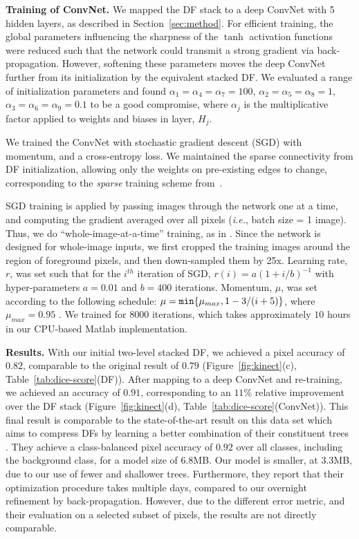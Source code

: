 \documentclass[twocolumn]{svjour3}
\begin{document}
\textbf{Training of ConvNet. } 
%
We mapped the DF stack to a deep ConvNet with 5 hidden layers, as described in Section~\ref{sec:method}. For efficient training, the global parameters influencing the sharpness of the $\tanh$ activation functions were reduced such that the network could transmit a strong gradient via back-propagation. However, softening these parameters moves the deep ConvNet further from its initialization by the equivalent stacked DF. We evaluated a range of initialization parameters and found
$\alpha_1=\alpha_{4}=\alpha_{7}=100$, $\alpha_{2}=\alpha_{5}=\alpha_{8}=1$, $\alpha_{3}=\alpha_{6}=\alpha_{9}=0.1$ to be a good compromise, where $\alpha_{j}$ is the multiplicative factor applied to weights and biases in layer, $H_j$.

We trained the ConvNet with stochastic gradient descent (SGD) with momentum, and a cross-entropy loss.
We maintained the sparse connectivity from DF initialization, allowing only the weights on pre-existing edges to change, corresponding to the \textit{sparse} training scheme from~\cite{Welbl14}.

SGD training is applied by passing images through the network one at a time, and computing the gradient averaged over all pixels (\emph{i.e.}, batch size = 1 image).
Thus, we do ``whole-image-at-a-time'' training, as in \cite{long_shelhamer_fcn_2015}.
Since the network is designed for whole-image inputs, we first cropped the training images around the region of foreground pixels, and then down-sampled them by 25x.
Learning rate, $r$, was set such that for the $i^{th}$ iteration of SGD, $r(i) = a(1 + i/b)^{-1}$ with hyper-parameters $a = 0.01$ and $b = 400$ iterations.
Momentum, $\mu$, was set according to the following schedule: $\mu =\nobreak \mathtt{min} \{ \mu_{max}, 1 - 3 / (i + 5) \}$, where $\mu_{max} = 0.95$ \cite{sutskever}.
We trained for 8000 iterations, which takes approximately $10$ hours in our CPU-based Matlab implementation.

%
\textbf{Results. }
%
With our initial two-level stacked DF, we achieved a pixel accuracy of $0.82$, comparable to the original result of $0.79$ \cite{denil} (Figure~\ref{fig:kinect}(c), Table~\ref{tab:dice-score}(DF)).
After mapping to a deep ConvNet and re-training, we achieved an accuracy of $0.91$, corresponding to an $11\%$ relative improvement over the DF stack (Figure~\ref{fig:kinect}(d), Table~\ref{tab:dice-score}(ConvNet)).
This final result is comparable to the state-of-the-art result on this data set which aims to compress DFs by learning a better combination of their constituent trees \cite{shaoqing15grrf}.
They achieve a class-balanced pixel accuracy of $0.92$ over all classes, including the background class, for a model size of 6.8MB. Our model is smaller, at 3.3MB, due to our use of fewer and shallower trees.
Furthermore, they report that their optimization procedure takes multiple days, compared to our overnight refinement by back-propagation.
However, due to the different error metric, and their evaluation on a selected subset of pixels, the results are not directly comparable.
\end{document}
